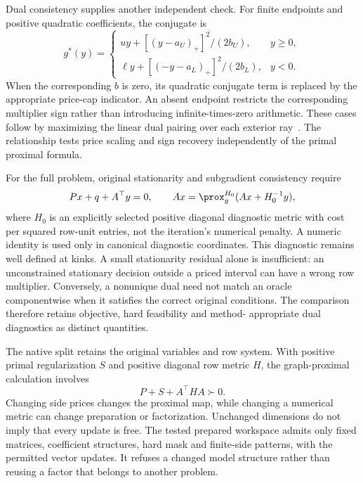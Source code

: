 Dual consistency supplies another independent check. For finite endpoints
and positive quadratic coefficients, the conjugate is
\begin{equation}\label{eq:paper-side-conjugate}
g^*(y)=\begin{cases}
 uy+[(y-a_U)_+]^2/(2b_U),&y\geq0,\\
 \ell y+[(-y-a_L)_+]^2/(2b_L),&y<0.
\end{cases}
\end{equation}
When the corresponding $b$ is zero, its quadratic conjugate term is
replaced by the appropriate price-cap indicator. An absent endpoint
restricts the corresponding multiplier sign rather than introducing
infinite-times-zero arithmetic. These cases follow by maximizing the
linear dual pairing over each exterior ray~\cite{rockafellar}. The
relationship tests price scaling and sign recovery independently of the
primal proximal formula.

For the full problem, original stationarity and subgradient consistency
require
\begin{equation}\label{eq:paper-side-kkt}
 Px+q+A^\top y=0,\qquad
 Ax=\prox_g^{H_0}(Ax+H_0^{-1}y),
\end{equation}
where $H_0$ is an explicitly selected positive diagonal diagnostic metric
with cost per squared row-unit entries, not the iteration's numerical
penalty. A numeric identity is used only in canonical diagnostic coordinates.
This diagnostic remains well
defined at kinks. A small stationarity residual alone is insufficient:
an unconstrained stationary decision outside a priced interval can have
a wrong row multiplier. Conversely, a nonunique dual need not match an
oracle componentwise when it satisfies the correct original conditions.
The comparison therefore retains objective, hard feasibility and method-
appropriate dual diagnostics as distinct quantities.

The native split retains the original variables and row system. With
positive primal regularization $S$ and positive diagonal row metric $H$,
the graph-proximal calculation involves
\begin{equation}\label{eq:paper-original-system}
 P+S+A^\top H A\succ0.
\end{equation}
Changing side prices changes the proximal map, while changing a numerical
metric can change preparation or factorization. Unchanged dimensions do
not imply that every update is free. The tested prepared workspace admits
only fixed matrices, coefficient structures, hard mask and finite-side
patterns, with the permitted vector updates. It refuses a changed model
structure rather than reusing a factor that belongs to another problem.

